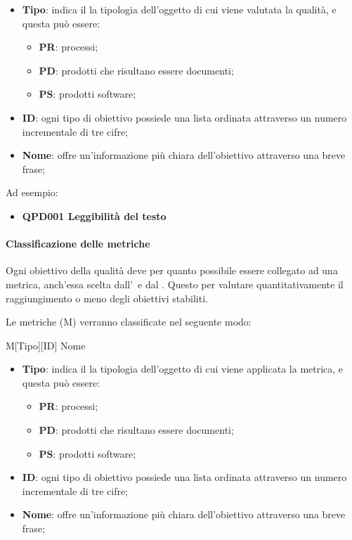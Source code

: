 			\begin{itemize}
				\item \textbf{Tipo}: indica il la tipologia dell'oggetto di cui viene valutata la qualità, e questa può essere:
				\begin{itemize}
					\item \textbf{PR}: processi;
					\item \textbf{PD}: prodotti che risultano essere documenti;
					\item \textbf{PS}: prodotti software;
				\end{itemize}
			
				\item \textbf{ID}: ogni tipo di obiettivo possiede una lista ordinata attraverso un numero incrementale di tre cifre;
				\item \textbf{Nome}: offre un'informazione più chiara dell'obiettivo attraverso una breve frase;
			\end{itemize}
		
			Ad esempio:
			
			\begin{itemize}
				\item \textbf{QPD001 Leggibilità del testo}
			\end{itemize}
			
			
			\paragraph{Classificazione delle metriche}
			Ogni obiettivo della qualità deve per quanto possibile essere collegato ad una metrica, anch'essa scelta dall'\Amm~e dal \Ver. Questo per valutare quantitativamente il raggiungimento o meno degli obiettivi stabiliti.
			
			Le metriche (M) verranno classificate nel seguente modo:
			
			\begin{center}
				M[Tipo][ID] Nome
			\end{center}
			
			\begin{itemize}
				\item \textbf{Tipo}: indica il la tipologia dell'oggetto di cui viene applicata la metrica, e questa può essere:
				\begin{itemize}
					\item \textbf{PR}: processi;
					\item \textbf{PD}: prodotti che risultano essere documenti;
					\item \textbf{PS}: prodotti software;
				\end{itemize}
				
				\item \textbf{ID}: ogni tipo di obiettivo possiede una lista ordinata attraverso un numero incrementale di tre cifre;
				\item \textbf{Nome}: offre un'informazione più chiara dell'obiettivo attraverso una breve frase;
			\end{itemize}
		
